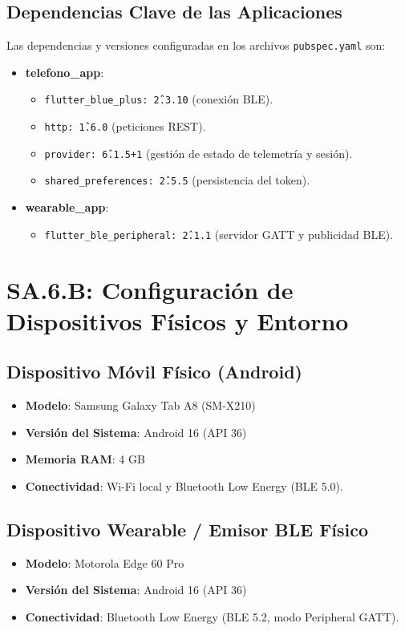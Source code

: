 \documentclass[11pt,a4paper]{article}
\begin{document}
\subsection{Dependencias Clave de las Aplicaciones}
Las dependencias y versiones configuradas en los archivos \texttt{pubspec.yaml} son:
\begin{itemize}
    \item \textbf{telefono\_app}:
    \begin{itemize}
        \item \texttt{flutter\_blue\_plus: \^2.3.10} (conexión BLE).
        \item \texttt{http: \^1.6.0} (peticiones REST).
        \item \texttt{provider: \^6.1.5+1} (gestión de estado de telemetría y sesión).
        \item \texttt{shared\_preferences: \^2.5.5} (persistencia del token).
    \end{itemize}
    \item \textbf{wearable\_app}:
    \begin{itemize}
        \item \texttt{flutter\_ble\_peripheral: \^2.1.1} (servidor GATT y publicidad BLE).
    \end{itemize}
\end{itemize}

\section{SA.6.B: Configuración de Dispositivos Físicos y Entorno}

\subsection{Dispositivo Móvil Físico (Android)}
\begin{itemize}
    \item \textbf{Modelo}: Samsung Galaxy Tab A8 (SM-X210)
    \item \textbf{Versión del Sistema}: Android 16 (API 36)
    \item \textbf{Memoria RAM}: 4 GB
    \item \textbf{Conectividad}: Wi-Fi local y Bluetooth Low Energy (BLE 5.0).
\end{itemize}

\subsection{Dispositivo Wearable / Emisor BLE Físico}
\begin{itemize}
    \item \textbf{Modelo}: Motorola Edge 60 Pro
    \item \textbf{Versión del Sistema}: Android 16 (API 36)
    \item \textbf{Conectividad}: Bluetooth Low Energy (BLE 5.2, modo Peripheral GATT).
\end{itemize}
\end{document}
